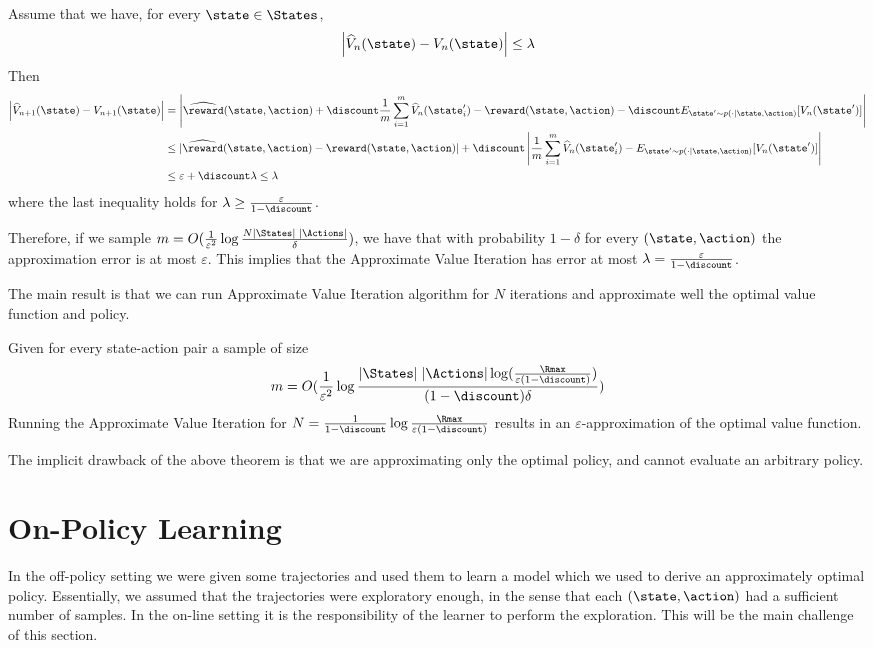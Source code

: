 Assume that we have, for every $\state \in \States$,
\[
\left|\widehat{V}_n(\state) - V_n(\state)\right|\leq \lambda
\]
Then
\begin{align*}
\left|\widehat{V}_{n+1}(\state)-V_{n+1}(\state)\right|& =
\left|\widehat{\reward}(\state,\action)+\discount
\frac{1}{m}\sum_{i=1}^m \widehat{V}_n(\state'_i) -
\reward(\state,\action)-\discount E_{\state'\sim p(\cdot
|\state,\action)} [V_n(\state')] \right|\\
&\leq |\widehat{\reward}(\state,\action)- \reward(\state,\action)|
+\discount \left| \frac{1}{m}\sum_{i=1}^m \widehat{V}_n(\state'_i) -
E_{\state'\sim p(\cdot
|\state,\action)} [V_n(\state')] \right|\\
%
 &\leq \varepsilon+\discount\lambda\leq \lambda
\end{align*}
where the last inequality holds for $\lambda\geq
\frac{\varepsilon}{1-\discount}$.

Therefore, if we sample $m=O(\frac{1}{\varepsilon^2}\log \frac{N
|\States| \;|\Actions|}{\delta})$, we have that with probability
$1-\delta$ for every $(\state,\action)$ the approximation error is
at most $\varepsilon$. This implies that the Approximate Value
Iteration has error at most
$\lambda=\frac{\varepsilon}{1-\discount}$.


The main result is that we can run Approximate Value Iteration
algorithm for $N$ iterations and approximate well the optimal value
function and policy.

\begin{theorem}
Given for every state-action pair a sample of size
\[
m=O(\frac{1}{\varepsilon^2}\log \frac{ |\States| \;|\Actions|\log (
\frac{\Rmax}{\varepsilon(1-\discount)} ) }{(1-\discount)\delta})
\]
Running the Approximate Value Iteration for
$N=\frac{1}{1-\discount}\log \frac{\Rmax}{\varepsilon(1-\discount)}$
results in an $\varepsilon$-approximation of the optimal value
function.
\end{theorem}

The implicit drawback of the above theorem is that we are
approximating only the optimal policy, and cannot evaluate an
arbitrary policy.

\section{On-Policy Learning}

In the off-policy setting we were given some trajectories and used
them to learn a model which we used to derive an approximately optimal
policy. Essentially, we assumed that the trajectories were
exploratory enough, in the sense that each $(\state,\action)$ had a
sufficient number of samples.
%
In the on-line setting it is the responsibility of the learner to
perform the exploration. This will be the main challenge of this section.

